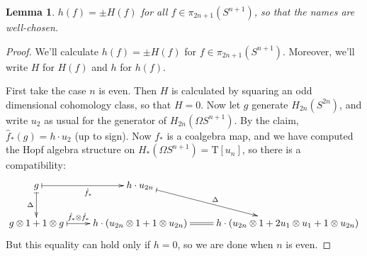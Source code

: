 \documentclass{article}
\newtheorem{lem}[thm]{Lemma}
\theoremstyle{definition}
\begin{document}
\begin{lem}\label{HopfisHopfLemma}
$h(f)=\pm H(f)$ for all $f\in\pi_{2n+1} (S^{n+1})$, so that the names are well-chosen.
\end{lem}
\begin{proof}
We'll calculate $h(f)=\pm H(f)$ for $f\in\pi_{2n+1} (S^{n+1})$. Moreover, we'll write $H$ for $H(f)$ and $h$ for $h(f)$.

First take the case $n$ is even.  Then $H$ is calculated by squaring an odd dimensional cohomology class, so that $H = 0$. 
Now let $g$ generate $H_{2n}(S^{2n})$, and write $u_2$ as usual for the generator of $H_{2n}(\Omega S^{n+1})$. By the claim, $\hat f_*(g)=h\cdot u_2$ (up to sign). Now $f_*$ is a coalgebra map, and we have computed the Hopf algebra structure on $H_*(\Omega S^{n+1})=\mathrm{T}[u_n]$, so there is a compatibility:
\[\xymatrix{
g\ar@{|->}[r]_{\hat f_*}\ar@{|->}[d]_{\Delta}&h\cdot u_{2n}\ar@{|->}[dr]^{\Delta}\\
g\otimes1+1\otimes g\ar@{|->}[r]^{\hat f_*\otimes\hat f_*\qquad}&\ar@{=}[r]h\cdot(u_{2n}\otimes1+1\otimes u_{2n})&h\cdot(u_{2n}\otimes1+2u_1\otimes u_1+1\otimes u_{2n})
}\]
But this equality can hold only if $h = 0$, so we are done when $n$ is even.


\end{proof}
\end{document}
